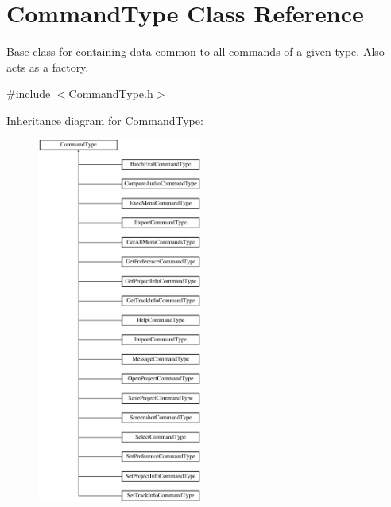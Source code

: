 \hypertarget{class_command_type}{}\section{Command\+Type Class Reference}
\label{class_command_type}


Base class for containing data common to all commands of a given type. Also acts as a factory.  




{\ttfamily \#include $<$Command\+Type.\+h$>$}

Inheritance diagram for Command\+Type\+:\begin{figure}[H]
\begin{center}
\leavevmode
\includegraphics[height=12.000000cm]{class_command_type}
\end{center}
\end{figure}
